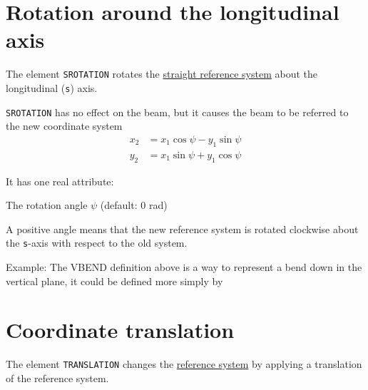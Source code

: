{\section{Rotation around the longitudinal axis}
\label{sec:srotation}

The element {\tt SROTATION} rotates the
\hyperref[subsec:local_straight]{straight reference system} about the
longitudinal ({\tt s}) axis. 


{\tt SROTATION} has no effect on the beam, but it causes the beam to be 
referred to the new coordinate system \\ 
\begin{equation}\begin{split}
x_2 &= x_1 \cos\psi - y_1 \sin\psi \\
y_2 &= x_1 \sin\psi + y_1 \cos\psi
\end{split}\end{equation}


It has one real attribute: 
\begin{madlist}
    The rotation angle $\psi$ (default: 0 rad) 
\end{madlist}

A positive angle means that the new reference system is rotated
clockwise about the {\tt s}-axis with respect to the old system.  

Example: 
The VBEND definition above is a way to represent a bend down in the
vertical plane, it could be defined more simply by  

\section{Coordinate translation}
\label{sec:translation}

The element {\tt TRANSLATION} changes the
\hyperref[subsec:local_straight]{reference system} 
by applying a translation of the reference system.

}
